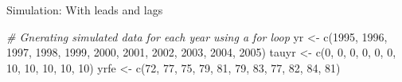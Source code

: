 \documentclass[
  ignorenonframetext,
]{beamer}
\newenvironment{Shaded}{\begin{snugshade}}{\end{snugshade}}
\newcommand{\CommentTok}[1]{\textcolor[rgb]{0.56,0.35,0.01}{\textit{#1}}}
\newcommand{\DecValTok}[1]{\textcolor[rgb]{0.00,0.00,0.81}{#1}}
\newcommand{\FunctionTok}[1]{\textcolor[rgb]{0.00,0.00,0.00}{#1}}
\newcommand{\NormalTok}[1]{#1}
\newcommand{\OtherTok}[1]{\textcolor[rgb]{0.56,0.35,0.01}{#1}}
\begin{document}
\begin{frame}[fragile]{Simulation: With leads and lags}
\protect\hypertarget{simulation-with-leads-and-lags-1}{}
\tiny

\begin{Shaded}
\begin{Highlighting}[]
\CommentTok{\# Gnerating simulated data for each year using a for loop}
\NormalTok{yr }\OtherTok{\textless{}{-}} \FunctionTok{c}\NormalTok{(}\DecValTok{1995}\NormalTok{, }\DecValTok{1996}\NormalTok{, }\DecValTok{1997}\NormalTok{, }\DecValTok{1998}\NormalTok{, }\DecValTok{1999}\NormalTok{, }\DecValTok{2000}\NormalTok{, }\DecValTok{2001}\NormalTok{, }\DecValTok{2002}\NormalTok{, }\DecValTok{2003}\NormalTok{,}
    \DecValTok{2004}\NormalTok{, }\DecValTok{2005}\NormalTok{)}
\NormalTok{tauyr }\OtherTok{\textless{}{-}} \FunctionTok{c}\NormalTok{(}\DecValTok{0}\NormalTok{, }\DecValTok{0}\NormalTok{, }\DecValTok{0}\NormalTok{, }\DecValTok{0}\NormalTok{, }\DecValTok{0}\NormalTok{, }\DecValTok{0}\NormalTok{, }\DecValTok{10}\NormalTok{, }\DecValTok{10}\NormalTok{, }\DecValTok{10}\NormalTok{, }\DecValTok{10}\NormalTok{, }\DecValTok{10}\NormalTok{)}
\NormalTok{yrfe }\OtherTok{\textless{}{-}} \FunctionTok{c}\NormalTok{(}\DecValTok{72}\NormalTok{, }\DecValTok{77}\NormalTok{, }\DecValTok{75}\NormalTok{, }\DecValTok{79}\NormalTok{, }\DecValTok{81}\NormalTok{, }\DecValTok{79}\NormalTok{, }\DecValTok{83}\NormalTok{, }\DecValTok{77}\NormalTok{, }\DecValTok{82}\NormalTok{, }\DecValTok{84}\NormalTok{, }\DecValTok{81}\NormalTok{)}


\end{Highlighting}
\end{Shaded}
\end{frame}
\end{document}
